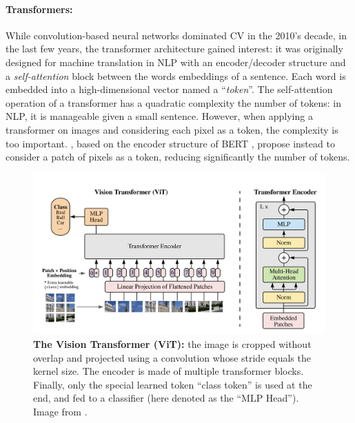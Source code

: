 \paragraph{Transformers:} While convolution-based neural networks dominated \acf{CV} in the 2010's
decade, in the last few years, the transformer architecture gained interest: it was originally
designed for machine translation in \ac{NLP} \citep{vaswani2017transformer} with an encoder/decoder
structure and a \textit{self-attention} block between the words embeddings of a sentence. Each word is
embedded into a high-dimensional vector named a ``\textit{token}''. The self-attention operation of a
transformer has a quadratic complexity \wrt the number of tokens: in \ac{NLP}, it is manageable
given a small sentence. However, when applying a transformer on images and considering each pixel
as a token, the complexity is too important. \cite{dosovitskiy2020vit}, based on the encoder
structure of BERT \citep{devlin2018bert}, propose instead to consider a patch of pixels as a token,
reducing significantly the number of tokens.

\begin{figure}[tb]
      \begin{center}
            \includegraphics[width=\linewidth]{images/related/vit.png}
      \end{center}
      \caption{\textbf{The Vision Transformer (ViT):} the image is cropped without overlap and
            projected using a convolution whose stride equals the kernel size. The encoder is made
            of multiple transformer blocks. Finally, only the special learned token ``class token''
            is used at the end, and fed to a classifier (here denoted as the ``MLP Head''). Image
            from \cite{dosovitskiy2020vit}.}
      \label{fig:related_vit}
\end{figure}

